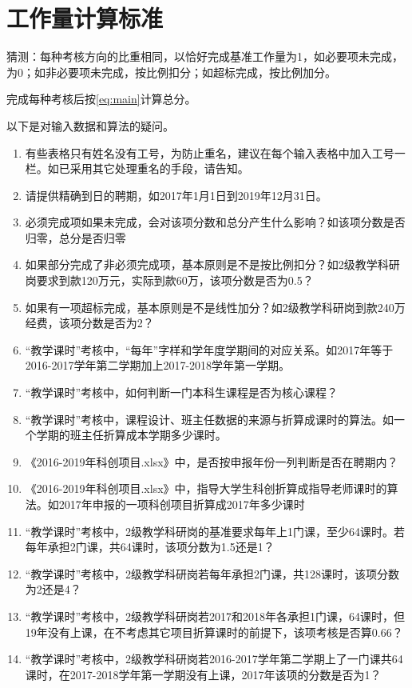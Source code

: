 \documentclass[UTF8,fontset=windowsnew]{ctexart}
\begin{document}
\section{工作量计算标准}
猜测：每种考核方向的比重相同，以恰好完成基准工作量为1，如必要项未完成，为0；如非必要项未完成，按比例扣分；如超标完成，按比例加分。\par
完成每种考核后按\autoref{eq:main}计算总分。\par
以下是对输入数据和算法的疑问。
\begin{enumerate}
  \item 有些表格只有姓名没有工号，为防止重名，建议在每个输入表格中加入工号一栏。如已采用其它处理重名的手段，请告知。
  \item 请提供精确到日的聘期，如2017年1月1日到2019年12月31日。
  \item 必须完成项如果未完成，会对该项分数和总分产生什么影响？如该项分数是否归零，总分是否归零
  \item 如果部分完成了非必须完成项，基本原则是不是按比例扣分？如2级教学科研岗要求到款120万元，实际到款60万，该项分数是否为0.5？
  \item 如果有一项超标完成，基本原则是不是线性加分？如2级教学科研岗到款240万经费，该项分数是否为2？
  \item ``教学课时''考核中，``每年''字样和学年度学期间的对应关系。如2017年等于2016-2017学年第二学期加上2017-2018学年第一学期。
  \item ``教学课时''考核中，如何判断一门本科生课程是否为核心课程？
  \item ``教学课时''考核中，课程设计、班主任数据的来源与折算成课时的算法。如一个学期的班主任折算成本学期多少课时。
  \item 《2016-2019年科创项目.xlsx》中，是否按申报年份一列判断是否在聘期内？
  \item 《2016-2019年科创项目.xlsx》中，指导大学生科创折算成指导老师课时的算法。如2017年申报的一项科创项目折算成2017年多少课时
  \item ``教学课时''考核中，2级教学科研岗的基准要求每年上1门课，至少64课时。若每年承担2门课，共64课时，该项分数为1.5还是1？
  \item ``教学课时''考核中，2级教学科研岗若每年承担2门课，共128课时，该项分数为2还是4？
  \item ``教学课时''考核中，2级教学科研岗若2017和2018年各承担1门课，64课时，但19年没有上课，在不考虑其它项目折算课时的前提下，该项考核是否算0.66？
  \item ``教学课时''考核中，2级教学科研岗若2016-2017学年第二学期上了一门课共64课时，在2017-2018学年第一学期没有上课，2017年该项的分数是否为1？

\end{enumerate}
\end{document}
